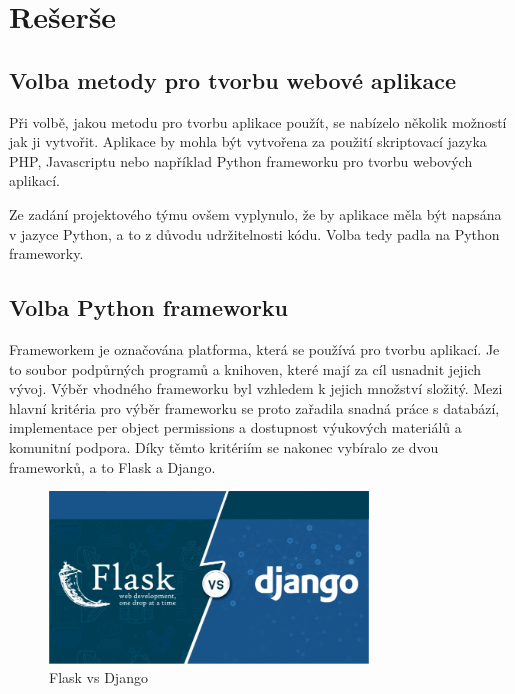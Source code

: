 \chapter{Rešerše}
\label{1-reserse}

\section{Volba metody pro tvorbu webové aplikace}

Při volbě, jakou metodu pro tvorbu aplikace použít, se nabízelo několik
možností jak ji vytvořit. Aplikace by mohla být vytvořena za použití
skriptovací jazyka PHP, Javascriptu nebo například Python frameworku 
pro tvorbu webových aplikací. 

Ze zadání projektového týmu ovšem vyplynulo, že by aplikace měla být
napsána v jazyce Python, a to z důvodu udržitelnosti kódu. Volba tedy
padla na Python frameworky.

\section{Volba Python frameworku}
Frameworkem je označována platforma, která se používá pro tvorbu aplikací. 
Je to soubor podpůrných programů a knihoven, které mají za cíl usnadnit 
jejich vývoj. Výběr vhodného frameworku byl vzhledem k jejich množství 
složitý. Mezi hlavní kritéria pro výběr frameworku se proto zařadila snadná
práce s databází, implementace per object permissions a dostupnost 
výukových materiálů a komunitní podpora. Díky těmto kritériím se nakonec 
vybíralo ze dvou frameworků, a to Flask a Django.

\begin{figure}[H] \centering
    \includegraphics[width=240pt]{./pictures/1-django-vs-flask.jpeg}
    \caption[Flask vs Django]{Flask vs Django \cite{django-vs-flask}}
	\label{fig:Flask vs Django}                                
\end{figure}

